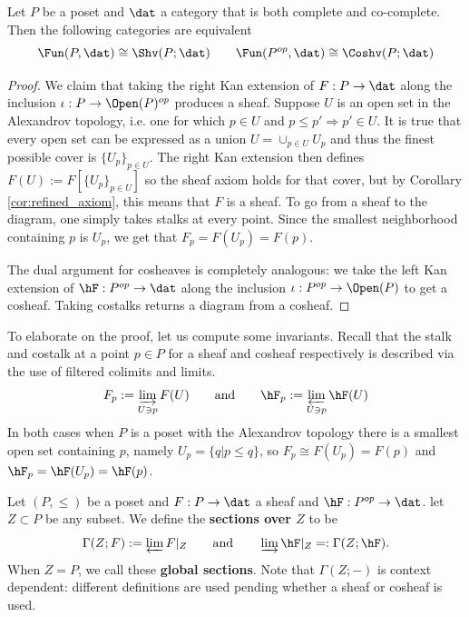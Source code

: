 \begin{thm}\label{thm:posets_sheaves}
	Let $P$ be a poset and $\dat$ a category that is both complete and co-complete. Then the following categories are equivalent
	\[
		\Fun(P,\dat)\cong\Shv(P;\dat) \qquad \Fun(P^{op},\dat)\cong\Coshv(P;\dat)
	\]
\end{thm}
\begin{proof}
	We claim that taking the right Kan extension of $F:P\to\dat$ along the inclusion $\iota:P\to\Open(P)^{op}$ produces a sheaf. Suppose $U$ is an open set in the Alexandrov topology, i.e. one for which $p\in U$ and $p\leq p' \Rightarrow p'\in U$. It is true that every open set can be expressed as a union $U=\cup_{p\in U} U_p$ and thus the finest possible cover is $\{U_p\}_{p\in U}$. The right Kan extension then defines $F(U):=F[\{U_p\}_{p\in U}]$ so the sheaf axiom holds for that cover, but by Corollary \ref{cor:refined_axiom}, this means that $F$ is a sheaf. To go from a sheaf to the diagram, one simply takes stalks at every point. Since the smallest neighborhood containing $p$ is $U_p$, we get that $F_p=F(U_p)=F(p)$. 
	
	The dual argument for cosheaves is completely analogous: we take the left Kan extension of $\hF:P^{op}\to\dat$ along the inclusion $\iota:P^{op}\to \Open(P)$ to get a cosheaf. Taking costalks returns a diagram from a cosheaf.
\end{proof}

\begin{rmk}
	To elaborate on the proof, let us compute some invariants. Recall that the stalk and costalk at a point $p\in P$ for a sheaf and cosheaf respectively is described via the use of filtered colimits and limits.
	\[
	F_p:=\varinjlim_{U\ni p} F(U) \qquad \mathrm{and} \qquad \hF_p:=\varprojlim_{U\ni p} \hF(U)
	\]
	In both cases when $P$ is a poset with the Alexandrov topology there is a smallest open set containing $p$, namely $U_p=\{q|p\leq q\}$, so $F_p\cong F(U_p)=F(p)$ and $\hF_p=\hF(U_p)=\hF(p)$.
\end{rmk}

\begin{defn}[Sections]\label{defn:sections}
	Let $(P,\leq)$ be a poset and $F:P\to\dat$ a sheaf and $\hF:P^{op}\to\dat$. let $Z\subset P$ be any subset. We define the \textbf{sections over $Z$} to be
	\[
		\Gamma(Z;F):=\varprojlim F|_Z \qquad \mathrm{and} \qquad \varinjlim \hF|_Z=:\Gamma(Z;\hF).
	\]
	When $Z=P$, we call these \textbf{global sections}. Note that $\Gamma(Z;-)$ is context dependent: different definitions are used pending whether a sheaf or cosheaf is used.
\end{defn}


